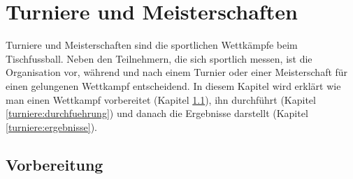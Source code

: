 \chapter{Turniere und Meisterschaften}
\label{turniere}

Turniere und Meisterschaften sind die sportlichen Wettkämpfe beim Tischfussball. 
Neben den Teilnehmern, die sich sportlich messen, ist die Organisation vor, während und nach einem Turnier oder einer Meisterschaft für einen gelungenen Wettkampf entscheidend.
In diesem Kapitel wird erklärt wie man einen Wettkampf vorbereitet (Kapitel \ref{turniere:vorbereitung}), ihn durchführt (Kapitel \ref{turniere:durchfuehrung}) und danach die Ergebnisse darstellt (Kapitel \ref{turniere:ergebnisse}).




 
\section{Vorbereitung}
\label{turniere:vorbereitung}

